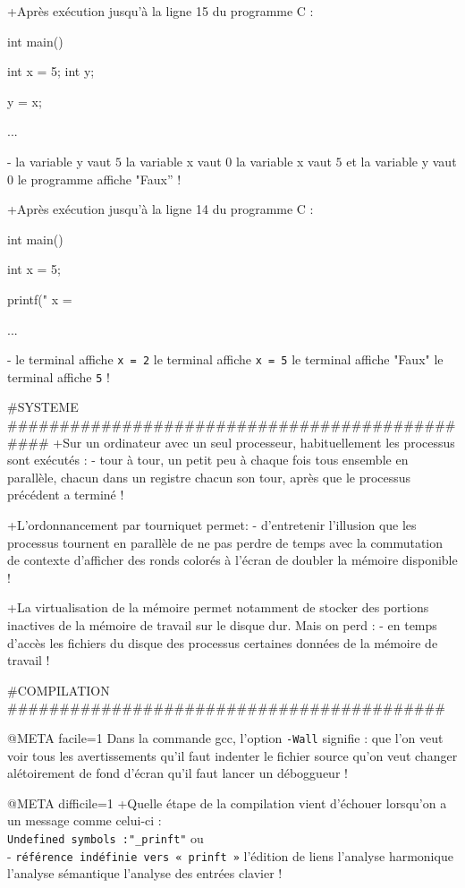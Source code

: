 +Après exécution jusqu'à la ligne 15 du programme  C :
\begin{listing}{10}
int main() {
    int x = 5;
    int y;

    y = x;

    ...
}
\end{listing}
-
 la variable y vaut $5$
 la variable x vaut $0$
 la variable x vaut $5$ et la variable y vaut $0$
 le programme affiche "Faux''
!

+Après exécution jusqu'à la ligne 14 du programme  C :
\begin{listing}{10}
int main() {
    int x = 5;

    printf(" x  = %

    ...
}
\end{listing}
-
 le terminal affiche \verb+x = 2+
 le terminal affiche \verb+x = 5+
 le terminal affiche "Faux"
 le terminal affiche \verb+5+
!

#SYSTEME ###############################################
+Sur un ordinateur avec un seul processeur, habituellement les processus sont
exécutés :
-
 tour à tour, un petit peu à chaque fois
 tous ensemble
 en parallèle, chacun dans un registre
 chacun son tour, après que le processus précédent a terminé
!

+L'ordonnancement par tourniquet permet:
-
 d'entretenir l'illusion que les processus tournent en parallèle
 de ne pas perdre de temps avec la commutation de contexte
 d'afficher des ronds colorés à l'écran
 de doubler la mémoire disponible
!

+La virtualisation de la mémoire permet notamment de stocker des portions inactives de la
mémoire de travail sur le disque dur. Mais on perd :
-
 en temps d'accès
 les fichiers du disque
 des processus
 certaines données de la mémoire de travail
!


#COMPILATION ##########################################

@META facile=1
Dans la commande gcc, l'option \verb|-Wall| signifie :
 que l'on veut voir tous les avertissements
 qu'il faut indenter le fichier source
 qu'on veut changer alétoirement de fond d'écran
 qu'il faut lancer un déboggueur
!

@META difficile=1
+Quelle étape de la compilation vient d'échouer lorsqu'on a un message
 comme celui-ci : \\
 \verb+Undefined symbols :"_prinft"+ ou \\
- \verb+référence indéfinie vers « prinft »+
 l'édition de liens
 l'analyse harmonique
 l'analyse sémantique
 l'analyse des entrées clavier
!

